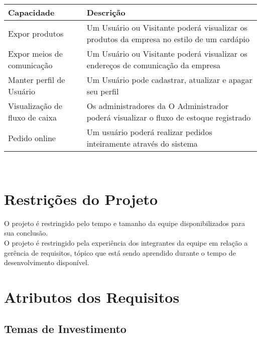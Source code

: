 \begin{apendicesenv}
\begin{tabular}{|l|p{3in}|}
  \hline
  \textbf{Capacidade} & \textbf{Descrição} \\ \hline
  Expor produtos & Um Usuário ou Visitante poderá visualizar os produtos da empresa no estilo de um cardápio \\ \hline
  Expor meios de comunicação & Um Usuário ou Visitante poderá visualizar os endereços de comunicação da empresa \\ \hline
  Manter perfil de Usuário & Um Usuário pode cadastrar, atualizar e apagar seu perfil \\ \hline
  Visualização de fluxo de caixa & Os administradores da O Administrador poderá visualizar o fluxo de estoque registrado \\ \hline
  Pedido online & Um usuário poderá realizar pedidos inteiramente através do sistema \\ \hline

\end{tabular}
\tab \\

{\large {\section { Restrições do Projeto\\ } } }

O projeto é restringido pelo tempo e tamanho da equipe disponibilizados para sua conclusão.\\
\tab O projeto é restringido pela experiência dos integrantes da equipe em relação a gerência de requisitos, tópico que está sendo aprendido durante o tempo de desenvolvimento disponível.\\
{\large {\section { Atributos dos Requisitos\\ } } }

{\large {\subsection { Temas de Investimento\\ } } }



\end{apendicesenv}
